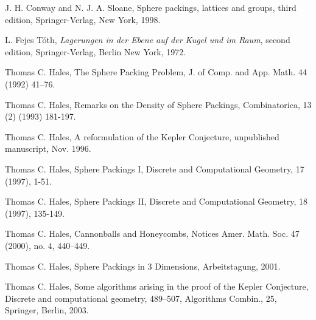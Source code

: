 
\begin{thebibliography}{TCH97a}

 J. H. Conway and N. J. A. Sloane, Sphere packings, lattices
    and groups,  third edition, Springer-Verlag, New York, 1998.

 L. Fejes T\'oth, {\it Lagerungen in der Ebene auf der
    Kugel und im Raum}, second edition,
    Springer-Verlag, Berlin New York, 1972.


 Thomas C. Hales, The Sphere Packing Problem, J. of Comp.
and App. Math. 44 (1992) 41--76.

 Thomas C. Hales, Remarks on the Density of Sphere Packings,
        Combinatorica, 13 (2) (1993) 181-197.

 Thomas C. Hales, A reformulation of the
Kepler Conjecture, unpublished manuscript, Nov. 1996.

 Thomas C. Hales, Sphere Packings I,
    Discrete and Computational Geometry, 17 (1997), 1-51.

 Thomas C. Hales, Sphere Packings II,
    Discrete and Computational Geometry, 18 (1997), 135-149.

 Thomas C. Hales, Cannonballs and Honeycombs,
Notices Amer. Math. Soc.  47  (2000),  no. 4, 440--449.

 Thomas C. Hales, Sphere Packings in 3
Dimensions, Arbeitstagung, 2001.

 Thomas C. Hales, Some algorithms arising in
the proof of the Kepler Conjecture,
 Discrete and computational geometry,
 489--507, Algorithms Combin., 25, Springer, Berlin, 2003.





\end{thebibliography}
